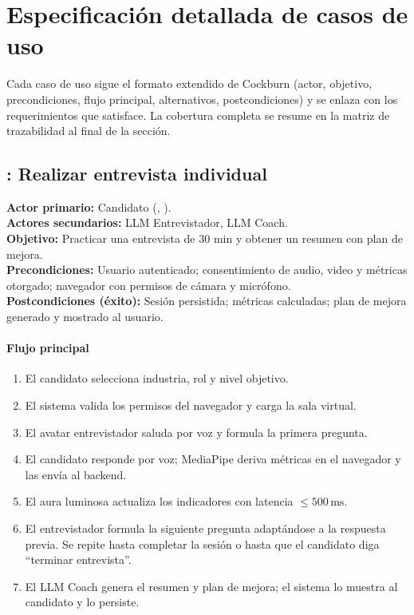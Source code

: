 \section{Especificación detallada de casos de uso}
\label{sec:casos}

Cada caso de uso sigue el formato extendido de Cockburn (actor, objetivo,
precondiciones, flujo principal, alternativos, postcondiciones) y se enlaza
con los requerimientos que satisface. La cobertura completa se resume en
la matriz de trazabilidad al final de la sección.

\subsection{: Realizar entrevista individual}
\begin{cajaCriterio}
\textbf{Actor primario:} Candidato (, ). \\
\textbf{Actores secundarios:} LLM Entrevistador, LLM Coach. \\
\textbf{Objetivo:} Practicar una entrevista de 30 min y obtener un
resumen con plan de mejora. \\
\textbf{Precondiciones:} Usuario autenticado; consentimiento de audio,
video y métricas otorgado; navegador con permisos de cámara y micrófono. \\
\textbf{Postcondiciones (éxito):} Sesión persistida; métricas calculadas;
plan de mejora generado y mostrado al usuario.
\end{cajaCriterio}

\paragraph{Flujo principal}
\begin{enumerate}
  \item El candidato selecciona industria, rol y nivel objetivo.
  \item El sistema valida los permisos del navegador y carga la sala
        virtual.
  \item El avatar entrevistador saluda por voz y formula la primera
        pregunta.
  \item El candidato responde por voz; MediaPipe deriva métricas en el
        navegador y las envía al backend.
  \item El aura luminosa actualiza los indicadores con latencia
        $\le 500\,\mathrm{ms}$.
  \item El entrevistador formula la siguiente pregunta adaptándose a la
        respuesta previa. Se repite hasta completar la sesión o hasta
        que el candidato diga ``terminar entrevista''.
  \item El LLM Coach genera el resumen y plan de mejora; el sistema lo
        muestra al candidato y lo persiste.
\end{enumerate}

